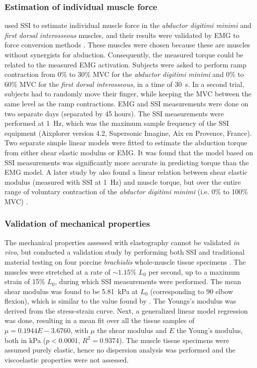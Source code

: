\subsubsection{Estimation of individual muscle force}
\citeauthor{bouillard_estimation_2011} used SSI to estimate individual muscle force in the \textit{abductor digitimi minimi} and \textit{first dorsal interosseous} muscles, and their results were validated by EMG to force conversion methods \cite{bouillard_estimation_2011}. These muscles were chosen because these are muscles without synergists for abduction. Consequently, the measured torque could be related to the measured EMG activation. Subjects were asked to perform ramp contraction from 0\% to 30\% MVC for the \textit{abductor digitimi minimi} and 0\% to 60\% MVC for the \textit{first dorsal interosseous}, in a time of \SI{30}{\second}. In a second trial, subjects had to randomly move their finger, while keeping the MVC between the same level as the ramp contractions. EMG and SSI measurements were done on two separate days (separated by 45 hours). The SSI measurements were performed at \SI{1}{\hertz}, which was the maximum sample frequency of the SSI equipment (Aixplorer version 4.2, Supersonic Imagine, Aix en Provence, France). Two separate simple linear models were fitted to estimate the abduction torque from either shear elastic modulus or EMG. It was found that the model based on SSI measurements was significantly more accurate in predicting torque than the EMG model. 
A later study by \citeauthor{ates_muscle_2015} also found a linear relation between shear elastic modulus (measured with SSI at \SI{1}{\hertz}) and muscle torque, but over the entire range of voluntary contraction of the \textit{abductor digitimi minimi} (i.e. 0\% to 100\% MVC) \cite{ates_muscle_2015}. 


\subsubsection{Validation of mechanical properties}
The mechanical properties assessed with elastography cannot be validated \textit{in vivo}, but \citeauthor{eby_validation_2013} conducted a validation study by performing both SSI and traditional material testing on four porcine \textit{brachialis} whole-muscle tissue specimens \cite{eby_validation_2013}. The muscles were stretched at a rate of $\sim{}1.15$\% $L_0$ per second, up to a maximum strain of 15\% $L_0$, during which SSI measurements were performed. The mean shear modulus was found to be \SI{5.81}{\kilo\pascal} at $L_0$ (corresponding to \SI{90}{\deg} elbow flexion), which is similar to the value found by \citeauthor{gennisson_viscoelastic_2010}. The Youngs's modulus was derived from the stress-strain curve. Next, a generalized linear model regression was done, resulting in a mean fit over all the tissue samples of $\mu = 0.1944 E - 3.6760$, with $\mu$ the shear modulus and $E$ the Young's modulus, both in \si{\kilo\pascal} ($p<0.0001$, $R^2 = 0.9374$). The muscle tissue specimens were assumed purely elastic, hence no dispersion analysis was performed and the viscoelastic properties were not assessed.



